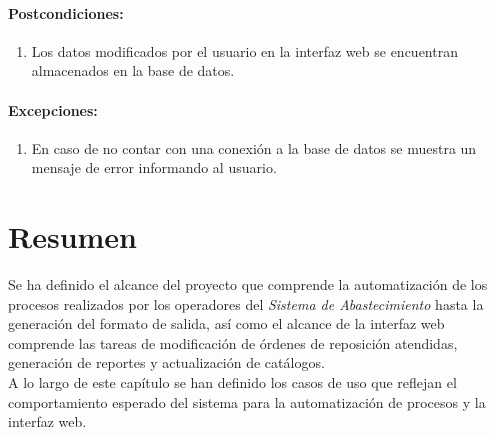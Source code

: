 \pagebreak

\paragraph{Postcondiciones:}
\begin{enumerate}
  \item Los datos modificados por el usuario en la interfaz web se encuentran almacenados en la base de datos.
\end{enumerate}
\paragraph{Excepciones:}
\begin{enumerate}
  \item En caso de no contar con una conexión a la base de datos se muestra un mensaje de error informando al usuario.
\end{enumerate}

\section{Resumen}
Se ha definido el alcance del proyecto que comprende la automatización de los procesos realizados por los operadores del \textit{Sistema de Abastecimiento} hasta la generación del formato de salida, así como el alcance de la interfaz web comprende las tareas de modificación de órdenes de reposición atendidas, generación de reportes y actualización de catálogos.\\
A lo largo de este capítulo se han definido los casos de uso que reflejan el comportamiento esperado del sistema para la automatización de procesos y la interfaz web.
